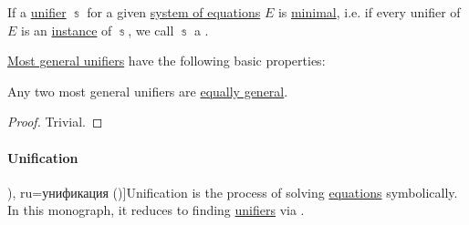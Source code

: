 \begin{definition}\label{def:fol_most_general_unifier}
  If a \hyperref[def:fol_equation/syntactic_solution]{unifier} \( \Bbbs \) for a given \hyperref[def:fol_equation/system]{system of equations} \( E \) is \hyperref[def:extremal_points/maximal_and_minimal_element]{minimal}, i.e. if every unifier of \( E \) is an \hyperref[def:fol_substitution_instance]{instance} of \( \Bbbs \), we call \( \Bbbs \) a .
\end{definition}

\begin{proposition}\label{thm:def:fol_most_general_unifier}
  \hyperref[def:fol_most_general_unifier]{Most general unifiers} have the following basic properties:
  \begin{thmenum}
     Any two most general unifiers are \hyperref[def:fol_substitution_equivalence]{equally general}.
  \end{thmenum}
\end{proposition}
\begin{proof}
   Trivial.
\end{proof}

\paragraph{Unification}

\begin{concept}\label{con:unification}
  \term[en=unification (\cite[71]{BaaderNipkow2012TermRewriting}), ru=унификация (\cite[\S 4.3]{Герасимов2014Вычислимость})]{Unification} is the process of solving \hyperref[def:equation]{equations} symbolically. In this monograph, it reduces to finding \hyperref[def:fol_equation/syntactic_solution]{unifiers} via .
\end{concept}

